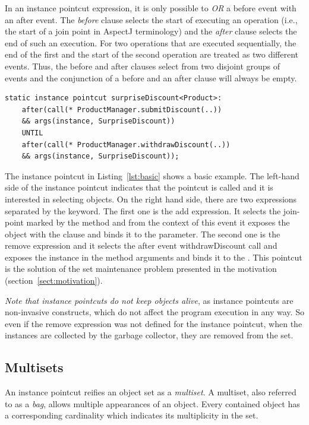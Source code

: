 In an instance pointcut expression, it is only possible to \emph{OR} a before event with an after event.
The \emph{before} clause selects the start of executing an operation (i.e., the start of a join point in AspectJ terminology) and the \emph{after} clause selects the end of such an execution.
For two operations that are executed sequentially, the end of the first and the start of the second operation are treated as two different events.
Thus, the before and after clauses select from two disjoint groups of events and the conjunction of a before and an after clause will always be empty.

\begin{lstlisting}[float=h!, caption={A basic instance pointcut declaration with add and remove expressions}, label={lst:basic}]
static instance pointcut surpriseDiscount<Product>:
	after(call(* ProductManager.submitDiscount(..))
	&& args(instance, SurpriseDiscount))
	UNTIL
	after(call(* ProductManager.withdrawDiscount(..))
	&& args(instance, SurpriseDiscount));
\end{lstlisting}

The instance pointcut in Listing~\ref{lst:basic} shows a basic example. The left-hand side of the instance pointcut indicates that the pointcut is called  and it is interested in selecting  objects.
On the right hand side, there are two expressions separated by the  keyword. The first one is the add expression. It selects the join-point marked by the method  and from the context of this event it exposes the  object with the  clause and binds it to the  parameter.
The second one is the remove expression and it selects the after event \textsf{withdrawDiscount} call and exposes the  instance in the method arguments and binds it to the .
This pointcut is the solution of the set maintenance problem presented in the motivation (section~\ref{sect:motivation}).


\emph{Note that instance pointcuts do not keep objects alive}, as instance pointcuts are non-invasive constructs, which do not affect the program execution in any way. So even if the remove expression was not defined for the  instance pointcut, when the  instances are collected by the garbage collector, they are removed from the set.

\subsection{Multisets}
An instance pointcut reifies an object set as a \emph{multiset}. A multiset, also referred to as a \emph{bag}, allows multiple appearances of an object. Every contained object has a corresponding cardinality which indicates its multiplicity in the set.
%

